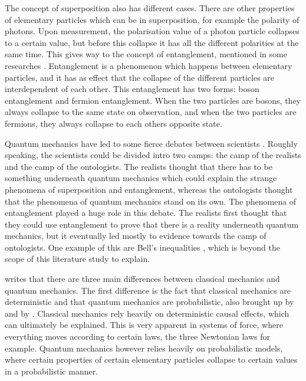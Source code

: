 \documentclass[11pt,twoside]{report} %
\begin{document}
The concept of superposition also has different cases. There are other properties of elementary particles which can be in superposition, for example the polarity of photons. Upon measurement, the polarisation value of a photon particle collapses to a certain value, but before this collapse it has all the different polarities at the same time. This gives way to the concept of entanglement, mentioned in some researches \cite{henriksen, hobson, kuttner}. Entanglement is a phenomenon which happens between elementary particles, and it has as effect that the collapse of the different particles are interdependent of each other. This entanglement has two forms: boson entanglement and fermion entanglement. When the two particles are bosons, they always collapse to the same state on observation, and when the two particles are fermions, they always collapse to each others opposite state.

Quantum mechanics have led to some fierce debates between scientists \cite{barnes}. Roughly speaking, the scientists could be divided intro two camps: the camp of the realists and the camp of the ontologists. The realists thought that there has to be something underneath quantum mechanics which could explain the strange phenomena of superposition and entanglement, whereas the ontologists thought that the phenomena of quantum mechanics stand on its own. The phenomena of entanglement played a huge role in this debate. The realists first thought that they could use entanglement to prove that there is a reality underneath quantum mechanics, but it eventually led mostly to evidence towards the camp of ontologists. One example of this are Bell's inequalities \cite{kuttner, muller}, which is beyond the scope of this literature study to explain.

 writes that there are three main differences between classical mechanics and quantum mechanics. The first difference is the fact that classical mechanics are deterministic and that quantum mechanics are probabilistic, also brought up by  and by . Classical mechanics rely heavily on deterministic causal effects, which can ultimately be explained. This is very apparent in systems of force, where everything moves according to certain laws, the three Newtonian laws for example. Quantum mechanics however relies heavily on probabilistic models, where certain properties of certain elementary particles collapse to certain values in a probabilistic manner.
\end{document}
